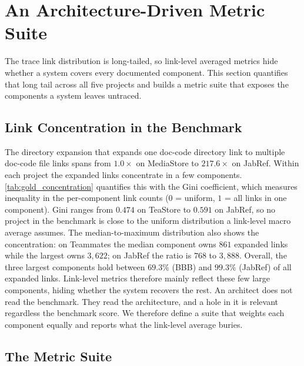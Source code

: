 \section{An Architecture-Driven Metric Suite}
\label{sec:metric}

The trace link distribution is long-tailed, so link-level averaged metrics hide whether a system covers every documented component.
This section quantifies that long tail across all five projects and builds a metric suite that exposes the components a system leaves untraced.

\subsection{Link Concentration in the Benchmark}
\label{sec:metric:prestudy}

The directory expansion that expands one doc-code directory link to multiple doc-code file links spans from $1.0\times$ on MediaStore to $217.6\times$ on JabRef.
Within each project the expanded links concentrate in a few components.
\autoref{tab:gold_concentration} quantifies this with the Gini coefficient, which measures inequality in the per-component link counts ($0$ = uniform, $1$ = all links in one component).
Gini ranges from $0.474$ on TeaStore to $0.591$ on JabRef,
so no project in the benchmark is close to the uniform distribution a link-level macro average assumes.
The median-to-maximum distribution also shows the concentration: 
on Teammates the median component owns $861$ expanded links while the largest owns $3{,}622$; on JabRef the ratio is $768$ to $3{,}888$.
Overall, the three largest components hold between $69.3\%$ (BBB) and $99.3\%$ (JabRef) of all expanded links.
Link-level metrics therefore mainly reflect these few large components, hiding whether the system recovers the rest.
An architect does not read the benchmark. 
They read the architecture, and a hole in it is relevant regardless the benchmark score.
We therefore define a suite that weights each component equally and reports what the link-level average buries.


\subsection{The Metric Suite}
\label{sec:metric:suite}

